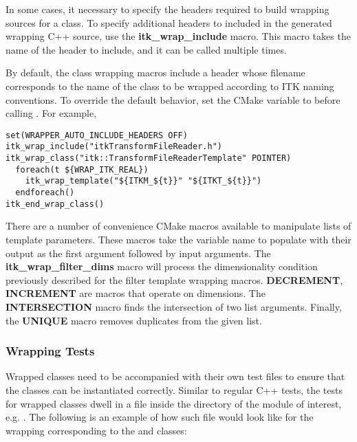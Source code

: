 In some cases, it necessary to specify the headers required to build wrapping
sources for a class. To specify additional headers to included in the generated
wrapping C++ source, use the \textbf{itk\_wrap\_include} macro. This macro takes the
name of the header to include, and it can be called multiple times.

By default, the class wrapping macros include a header whose filename
corresponds to the name of the class to be wrapped according to ITK naming
conventions. To override the default behavior, set the CMake variable
 to  before calling
. For example,

\begin{verbatim}
set(WRAPPER_AUTO_INCLUDE_HEADERS OFF)
itk_wrap_include("itkTransformFileReader.h")
itk_wrap_class("itk::TransformFileReaderTemplate" POINTER)
  foreach(t ${WRAP_ITK_REAL})
    itk_wrap_template("${ITKM_${t}}" "${ITKT_${t}}")
  endforeach()
itk_end_wrap_class()
\end{verbatim}

There are a number of convenience CMake macros available to manipulate lists
of template parameters. These macros take the variable name to populate with
their output as the first argument followed by input arguments. The
\textbf{itk\_wrap\_filter\_dims} macro will process the dimensionality
condition previously described for the filter template wrapping macros.
\textbf{DECREMENT}, \textbf{INCREMENT} are macros that operate on dimensions.
The \textbf{INTERSECTION} macro finds the intersection of two list arguments.
Finally, the \textbf{UNIQUE} macro removes duplicates from the given list.


\subsubsection{Wrapping Tests}

Wrapped classes need to be accompanied with their own test files to ensure that
the classes can be instantiated correctly. Similar to regular C++ tests, the
tests for wrapped classes dwell in a  file inside the
 directory of the module of interest, e.g.
. The
following is an example of how such file would look like for the wrapping
corresponding to the  and
 classes:

